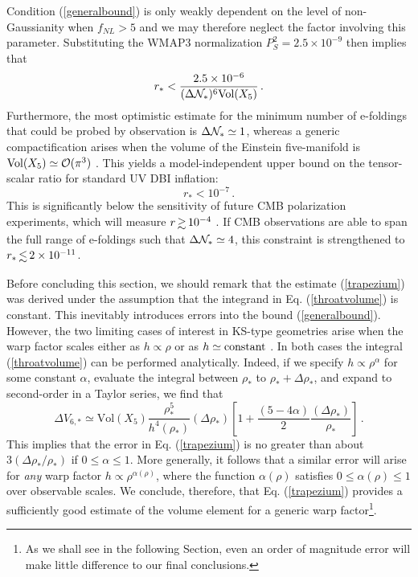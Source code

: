 Condition (\ref{generalbound}) is 
only weakly dependent on the level of non-Gaussianity 
when $f_{NL} > 5$ and we may therefore neglect the 
factor involving this parameter. 
Substituting the WMAP3 normalization 
$P_S^2 = 2.5 \times 10^{-9}$ then implies that 
\begin{equation}
\label{upperbound}
r_{*} < \frac{2.5\times 10^{-6}}{( \Delta {\cal{N}}_*)^6 \mathrm{Vol}(X_5)} \,.
\end{equation}
Furthermore, the most optimistic 
estimate for the minimum number of e-foldings that could be 
probed by observation is $\Delta {\cal{N}}_{*} \simeq 1$, whereas
a generic compactification arises when 
the volume of the Einstein five-manifold is $\mathrm{Vol}(X_5) 
\simeq {\cal{O}} (\pi^3)$ \cite{ks}. This yields a model-independent 
upper bound on the tensor-scalar ratio for standard UV DBI inflation:   
\begin{equation}
\label{standardbound}
r_* < 10^{-7} \,.
\end{equation}
This is significantly below the sensitivity 
of future CMB polarization experiments, which will measure 
${r} \, {\gsim} \, 10^{-4}$ \cite{clover,vpj}. %
If CMB  
observations are able to span the full range of e-foldings such that
$\Delta {\cal{N}}_* \simeq 4$, this constraint is strengthened to 
${r_*} \, {\lsim} \, {2 \times 10^{-11}}$.

Before concluding this section, we should remark that 
the estimate (\ref{trapezium}) was derived under the assumption  
that the integrand in Eq. (\ref{throatvolume})  
is constant. This inevitably introduces errors into the bound
(\ref{generalbound}). However, the two limiting cases of interest 
in KS-type geometries arise 
when the warp factor scales either as $h \propto \rho$
or as $h \simeq {\rm constant}$ \cite{ks,kt}. In both cases
the integral (\ref{throatvolume}) can be performed analytically. 
Indeed, if we specify $h \propto \rho^{\alpha}$ for some constant $\alpha$,  
evaluate the integral between $\rho_{*}$ 
to $\rho_{*}+\Delta \rho_{*}$, and expand to second-order in a 
Taylor series, we find that  
\begin{equation}
\label{limits}
\Delta V_{6,*} \simeq \mathrm{Vol}(X_5) \frac{\rho^5_{*}}{h^{4} 
(\rho_{*} )}(\Delta \rho_*) 
\left[ 1 +\frac{(5-4 \alpha )}{2} 
\frac{(\Delta \rho_*)}{\rho_{*}} \right]  \,.
\end{equation}
This implies that the error in Eq. (\ref{trapezium}) 
is no greater than 
about $3 (\Delta \rho_* / \rho_*)$ if  
$0 \le \alpha \le 1$. More generally, it follows that a similar
error will arise for {\em any} warp factor 
$h \propto \rho^{\alpha (\rho )}$, where the function 
$\alpha (\rho)$ satisfies $0 \le \alpha (\rho ) \le 1$ 
over observable scales. 
We conclude, therefore, that Eq. (\ref{trapezium}) 
provides a sufficiently good estimate of the volume element  
for a generic warp factor\footnote{As we shall see in the following Section, 
even an order of magnitude error will make little 
difference to our final conclusions.}.  
% 
% 
% 
% 
